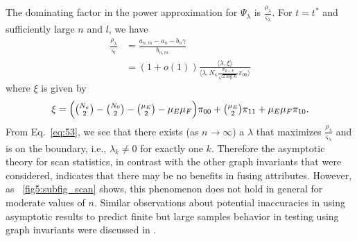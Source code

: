\documentclass[10pt,journal,compsoc]{IEEEtran}
\theoremstyle{definition}
\begin{document}
The dominating factor in the power approximation for $\Psi_{\lambda}$
is $\tfrac{\rho_{\lambda}}{\varsigma_{\lambda}}$. For $t = t^{*}$ and
sufficiently large $n$ and $l$, we have
\begin{equation}
  \label{eq:53}
  \begin{split}
    \frac{\rho_{\lambda}}{\varsigma_{l}} &= \frac{a_{n,m} - a_n - b_n
      \gamma}{b_{n,m}} \\
    &= (1 + o(1)) \frac{ \langle \lambda, \xi \rangle}{\langle
      \lambda, N_{\kappa} \tfrac{\sigma_{E+F}}{\sqrt{2 \log{n}}}
      \pi_{00} \rangle}
  \end{split}
\end{equation}
where $\xi$ is given by
\begin{equation*}
 \xi =  \Bigl(\tbinom{N_{\kappa}}{2} -
    \tbinom{N_0}{2} - \tbinom{\mu_E}{2} - \mu_E \mu_F\Bigr)\pi_{00} +
    \tbinom{\mu_{E}}{2} \pi_{11} + \mu_E \mu_F \pi_{10}.
\end{equation*}
From Eq.~\eqref{eq:53}, we see that there exists (as $n \rightarrow
\infty$) a $\lambda$ that maximizes
$\tfrac{\rho_\lambda}{\varsigma_{\lambda}}$ and is on the boundary,
i.e., $\lambda_k \not = 0$ for exactly one $k$. Therefore the asymptotic theory
for scan statistics, in contrast with the other graph invariants that
were considered, indicates that there may be no benefits in fusing
attributes. However, as \figurename~\ref{fig5:subfig_scan} shows, this
phenomenon does not hold in general for moderate values of
$n$. Similar observations about potential inaccuracies in using
asymptotic results to predict finite but large samples behavior
in testing using graph invariants were discussed in
\cite{rukhin11,priebe10:_you_i}.   
\end{document}
